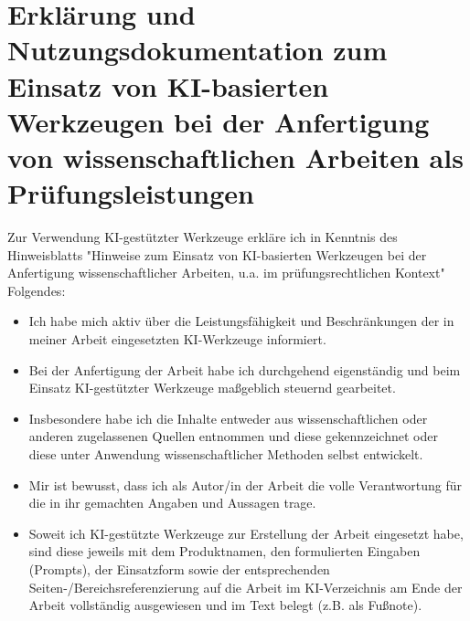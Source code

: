\thispagestyle{empty}
\section*{Erklärung und Nutzungsdokumentation zum Einsatz von KI-basierten Werkzeugen bei der Anfertigung von wissenschaftlichen Arbeiten als Prüfungsleistungen}


Zur Verwendung KI-gestützter Werkzeuge erkläre ich in Kenntnis des Hinweisblatts "Hinweise zum Einsatz von KI-basierten Werkzeugen bei der Anfertigung wissenschaftlicher Arbeiten, u.a. im prüfungsrechtlichen Kontext" \space Folgendes:

\begin{itemize}[label=\textbullet, itemsep=1em] %
    \item Ich habe mich aktiv über die Leistungsfähigkeit und Beschränkungen der in meiner Arbeit eingesetzten KI-Werkzeuge informiert.
    \item Bei der Anfertigung der Arbeit habe ich durchgehend eigenständig und beim Einsatz KI-gestützter Werkzeuge maßgeblich steuernd gearbeitet.
    \item Insbesondere habe ich die Inhalte entweder aus wissenschaftlichen oder anderen zugelassenen Quellen entnommen und diese gekennzeichnet oder diese unter Anwendung wissenschaftlicher Methoden selbst entwickelt.
    \item Mir ist bewusst, dass ich als Autor/in der Arbeit die volle Verantwortung für die in ihr gemachten Angaben und Aussagen trage.
    \item Soweit ich KI-gestützte Werkzeuge zur Erstellung der Arbeit eingesetzt habe, sind diese jeweils mit dem Produktnamen, den formulierten Eingaben (Prompts), der Einsatzform sowie der entsprechenden Seiten-/Bereichsreferenzierung auf die Arbeit im KI-Verzeichnis am Ende der Arbeit vollständig ausgewiesen und im Text belegt (z.B. als Fußnote).
\end{itemize}

\vspace{2cm} %

